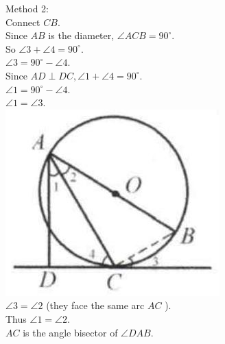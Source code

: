 \documentclass{article}
\begin{document}
Method 2:\\
Connect \(C B\).\\
Since \(A B\) is the diameter, \(\angle A C B=90^{\circ}\).\\
So \(\angle 3+\angle 4=90^{\circ}\).\\
\(\angle 3=90^{\circ}-\angle 4\).\\
Since \(A D \perp D C, \angle 1+\angle 4=90^{\circ}\).\\
\(\angle 1=90^{\circ}-\angle 4\).\\
\(\angle 1=\angle 3\).\\
\centering
\includegraphics[width=\textwidth]{images/164(3).jpg}\\
\(\angle 3=\angle 2\) (they face the same arc \(A C\) ).\\
Thus \(\angle 1=\angle 2\).\\
\(A C\) is the angle bisector of \(\angle D A B\).
\end{document}
